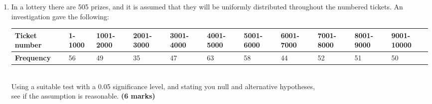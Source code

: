 \documentclass[fleqn]{article}
\begin{document}
\begin{enumerate}
        It is thought that the distribution s Poisson.
        \begin{enumerate}[label=\bfseries \alph*\space ]
            \item Give reasons why this assumption might be made. \hfill\textbf{(2 marks)}
            \item Conduct a test at the 0.05 level of significance to see if the assumption is reasonable.\hfill\textbf{(8 marks)}
        \end{enumerate}
    \item In a lottery there are 505 prizes, and it is assumed that they will be uniformly distributed throughout the numbered tickets. An investigation gave the following:\vspace{2mm}\\
        \begin{tabularx}{0.945\textwidth}{|X|*{10}{P{12mm}|}}
            \hline
            \textbf{Ticket number} & 1-1000 & 1001-2000 & 2001-3000 & 3001-4000 & 4001-5000 & 5001-6000 & 6001-7000 & 7001-8000 & 8001-9000 & 9001-10000   \\\hline
            \textbf{Frequency}     & 56     & 49        & 35        & 47        & 63        & 58        & 44        & 52        & 51        & 50           \\\hline
        \end{tabularx}\vspace{3mm}\\
        
        Using a suitable test with a 0.05 significance level, and stating you null and alternative hypotheses, \\see if the assumption is reasonable. \hfill\textbf{(6 marks)}
        

\end{enumerate}
\end{document}
